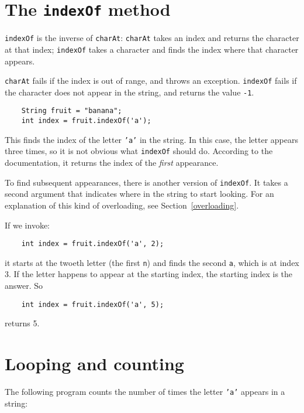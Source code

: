 \section{The {\tt indexOf} method}

{\tt indexOf} is the inverse of {\tt charAt}:
{\tt charAt} takes an index and returns the character at that
index;  {\tt indexOf} takes a character and finds the index
where that character appears.

{\tt charAt} fails if the index is out of range, and throws an
exception.  {\tt indexOf} fails if the character does not appear in
the string, and returns the value {\tt -1}.

\begin{lstlisting}
    String fruit = "banana";
    int index = fruit.indexOf('a');
\end{lstlisting}
%
This finds the index of the letter {\tt 'a'} in the string.
In this case, the letter appears three times, so it is not
obvious what {\tt indexOf} should do.  According to the
documentation, it returns the index of the {\em first} appearance.

To find subsequent appearances, there is another
version of {\tt indexOf}.  It takes a
second argument that indicates where in the string to start
looking.  For an explanation of this kind
of overloading, see Section~\ref{overloading}.

If we invoke:

\begin{lstlisting}
    int index = fruit.indexOf('a', 2);
\end{lstlisting}
%
it starts at the twoeth letter (the first {\tt n}) and finds
the second {\tt a}, which is at index 3.  If the letter happens
to appear at the starting index, the starting index is the
answer.  So

\begin{lstlisting}
    int index = fruit.indexOf('a', 5);
\end{lstlisting}
%
returns 5.


\section{Looping and counting}
\label{loopcount}

The following program counts the
number of times the letter {\tt 'a'} appears in a string:

